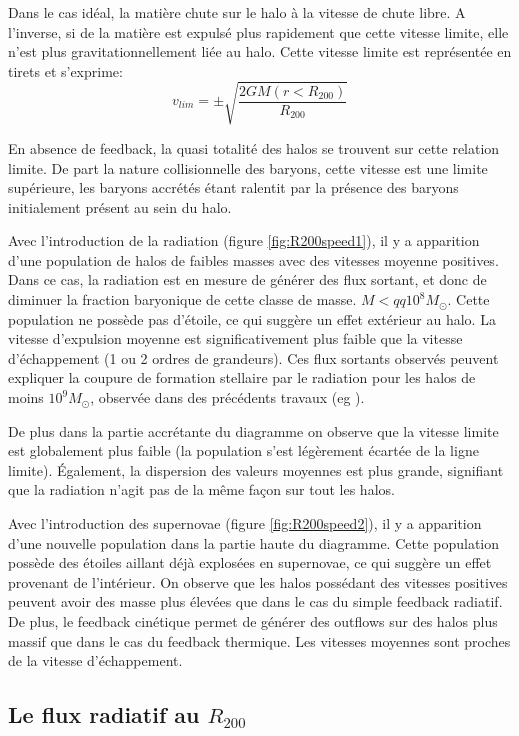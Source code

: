 Dans le cas idéal, la matière chute sur le halo à la vitesse de chute libre.
A l'inverse, si de la matière est expulsé plus rapidement que cette vitesse limite, elle n'est plus gravitationnellement liée au halo.
Cette vitesse limite est représentée en tirets et s'exprime:
\begin{equation}
v_{lim} = \pm \sqrt{\frac{2 GM (r<R_{200})} {R_{200}} } 
\end{equation}

En absence de feedback, la quasi totalité des halos se trouvent sur cette relation limite.
De part la nature collisionnelle des baryons, cette vitesse est une limite supérieure, les baryons accrétés étant ralentit par la présence des baryons initialement présent au sein du halo.

Avec l'introduction de la radiation (figure \ref{fig:R200speed1}), il y a apparition d'une population de halos de faibles masses avec des vitesses moyenne positives.
Dans ce cas, la radiation est en mesure de générer des flux sortant, et donc de diminuer la fraction baryonique de cette classe de masse. $M< qq 10^8 M_\odot$.
Cette population ne possède pas d'étoile, ce qui suggère un effet extérieur au halo.
La vitesse d'expulsion moyenne est significativement plus faible que la vitesse d'échappement (1 ou 2 ordres de grandeurs).
Ces flux sortants observés peuvent expliquer la coupure de formation stellaire par le radiation pour les halos de moins $10^9 M_\odot$, observée dans des précédents travaux (eg \cite{ocvirk_cosmic_2015}).

De plus dans la partie accrétante du diagramme on observe que la vitesse limite est globalement plus faible (la population s'est légèrement écartée de la ligne limite).
Également, la dispersion des valeurs moyennes est plus grande, signifiant que la radiation n'agit pas de la même façon sur tout les halos.

Avec l'introduction des supernovae (figure \ref{fig:R200speed2}), il y a apparition d'une nouvelle population dans la partie haute du diagramme.
Cette population possède des étoiles aillant déjà explosées en supernovae, ce qui suggère un effet provenant de l'intérieur.
On observe que les halos possédant des vitesses positives peuvent avoir des masse plus élevées que dans le cas du simple feedback radiatif.
De plus, le feedback cinétique permet de générer des outflows sur des halos plus massif que dans le cas du feedback thermique.
Les vitesses moyennes sont proches de la vitesse d'échappement.

\subsection{Le flux radiatif au $R_{200}$}
\label{sec:radflow}

